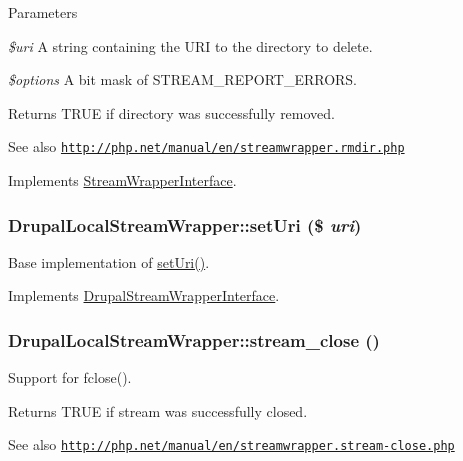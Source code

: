 \begin{DoxyParams}{Parameters}
\item[{\em \$uri}]A string containing the URI to the directory to delete. \item[{\em \$options}]A bit mask of STREAM\_\-REPORT\_\-ERRORS.\end{DoxyParams}
\begin{DoxyReturn}{Returns}
TRUE if directory was successfully removed.
\end{DoxyReturn}
\begin{DoxySeeAlso}{See also}
\href{http://php.net/manual/en/streamwrapper.rmdir.php}{\tt http://php.net/manual/en/streamwrapper.rmdir.php} 
\end{DoxySeeAlso}


Implements \hyperlink{interfaceStreamWrapperInterface}{StreamWrapperInterface}.\hypertarget{classDrupalLocalStreamWrapper_ae9502ad74b2498b9c93e4affc43e7109}{
\subsubsection[{setUri}]{\setlength{\rightskip}{0pt plus 5cm}DrupalLocalStreamWrapper::setUri (\$ {\em uri})}}
\label{classDrupalLocalStreamWrapper_ae9502ad74b2498b9c93e4affc43e7109}
Base implementation of \hyperlink{classDrupalLocalStreamWrapper_ae9502ad74b2498b9c93e4affc43e7109}{setUri()}. 

Implements \hyperlink{interfaceDrupalStreamWrapperInterface_aa04b517df51d24252e656d67515224f6}{DrupalStreamWrapperInterface}.\hypertarget{classDrupalLocalStreamWrapper_ac10b105d5d7cf732ea22db1c6545e2a3}{
\subsubsection[{stream\_\-close}]{\setlength{\rightskip}{0pt plus 5cm}DrupalLocalStreamWrapper::stream\_\-close ()}}
\label{classDrupalLocalStreamWrapper_ac10b105d5d7cf732ea22db1c6545e2a3}
Support for fclose().

\begin{DoxyReturn}{Returns}
TRUE if stream was successfully closed.
\end{DoxyReturn}
\begin{DoxySeeAlso}{See also}
\href{http://php.net/manual/en/streamwrapper.stream-close.php}{\tt http://php.net/manual/en/streamwrapper.stream-\/close.php} 
\end{DoxySeeAlso}


